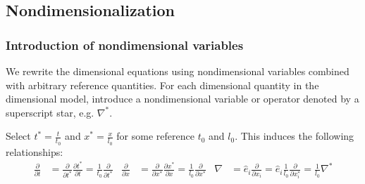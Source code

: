 \documentclass[letterpaper,11pt,nointlimits,reqno,draft]{amsart}
\begin{document}
\subsection{Nondimensionalization}
\label{sec:nondim}

\subsubsection{Introduction of nondimensional variables}
\label{sec:intronondim}

We rewrite the dimensional equations using nondimensional variables
combined with arbitrary reference quantities.  For each dimensional
quantity in the dimensional model, introduce a nondimensional variable
or operator denoted by a superscript star, e.g. $\nabla^{*}$.

Select $t^{*}=\frac{t}{t_{0}}$ and $x^{*}=\frac{x}{l_{0}}$ for some reference
$t_{0}$ and $l_{0}$.  This induces the following relationships:
\begin{align}
  \frac{\partial{}}{\partial{}t}
  &=
  \frac{\partial{}}{\partial{}t^{*}}
  \frac{\partial{}t^{*}}{\partial{}t}
  =
  \frac{1}{t_{0}}\frac{\partial}{\partial{}t^{*}}
  &
  \frac{\partial{}}{\partial{}x}
  &=
  \frac{\partial{}}{\partial{}x^{*}}
  \frac{\partial{}x^{*}}{\partial{}x}
  =
  \frac{1}{l_{0}}\frac{\partial}{\partial{}x^{*}}
  &
  \nabla
  &=
  \hat{e}_{i} \frac{\partial{}}{\partial{}x_{i}}
  =
  \hat{e}_{i} \frac{1}{l_{0}} \frac{\partial}{\partial{}x^{*}_{i}}
  =
  \frac{1}{l_{0}} \nabla^{*}
  \label{eq:nondim_derivops}
\end{align}
\end{document}
